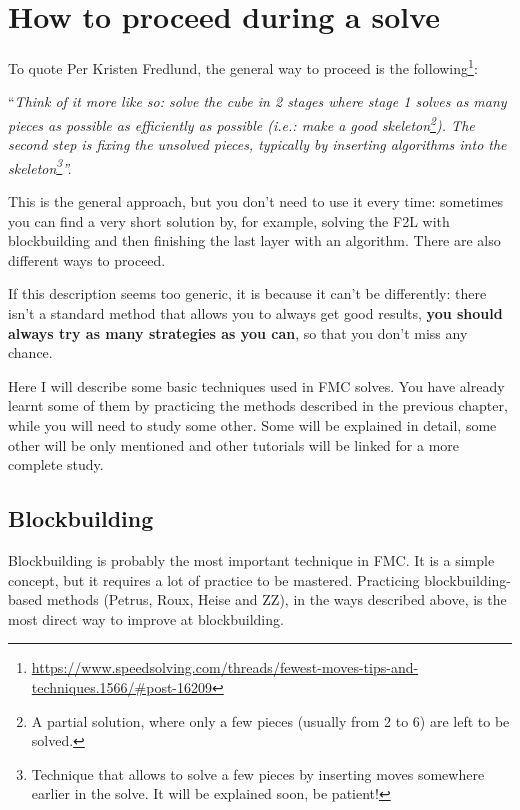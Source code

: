 \documentclass[11pt,a4paper]{book}
\begin{document}
\chapter{How to proceed during a solve}

To quote Per Kristen Fredlund, the general way to proceed is the following\footnote{\url{https://www.speedsolving.com/threads/fewest-moves-tips-and-techniques.1566/\#post-16209}}:

\begin{center}“\emph{Think of it more like so: solve the cube in 2 stages where stage 1 solves as many pieces as possible as efficiently as possible (i.e.: make a good skeleton\footnote{A partial solution, where only a few pieces (usually from 2 to 6) are left to be solved.}). The second step is fixing the unsolved pieces, typically by inserting algorithms into the skeleton\footnote{Technique that allows to solve a few pieces by inserting moves somewhere earlier in the solve. It will be explained soon, be patient!}''.}
\end{center}

This is the general approach, but you don't need to use it every time: sometimes you can find a very short solution by, for example, solving the F2L with blockbuilding and then finishing the last layer with an algorithm. There are also different ways to proceed.

If this description seems too generic, it is because it can't be differently: there isn't a standard method that allows you to always get good results, \textbf{you should always try as many strategies as you can}, so that you don't miss any chance.

Here I will describe some basic techniques used in FMC solves. You have already learnt some of them by practicing the methods described in the previous chapter, while you will need to study some other. Some will be explained in detail, some other will be only mentioned and other tutorials will be linked for a more complete study.

\section{Blockbuilding}

Blockbuilding is probably the most important technique in FMC. It is a simple concept, but it requires a lot of practice to be mastered. Practicing blockbuilding-based methods (Petrus, Roux, Heise and ZZ), in the ways described above, is the most direct way to improve at blockbuilding.
\end{document}

